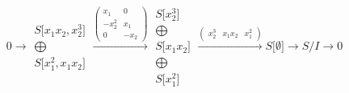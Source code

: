 \documentclass[12pt,a3paper,landscape]{amsart}
\numberwithin{equation}{section}
\theoremstyle{plain}
\theoremstyle{definition}
\begin{document}
$$
0 \rightarrow \begin{matrix}
S \lbrack x_{1}x_{2},x_{2}^{3} \rbrack \\ \bigoplus \\
S \lbrack x_{1}^{2},x_{1}x_{2} \rbrack
\end{matrix}
\xrightarrow{\left( \begin{matrix}
x_{1} & 0 \\
-x_{2}^{2} & x_{1} \\
0 & -x_{2}
\end{matrix} \right)}\begin{matrix}
S \lbrack x_{2}^{3} \rbrack \\ \bigoplus \\
S \lbrack x_{1}x_{2} \rbrack \\ \bigoplus \\
S \lbrack x_{1}^{2} \rbrack
\end{matrix}
\xrightarrow{\left( \begin{matrix}
x_{2}^{3} & x_{1}x_{2} & x_{1}^{2}
\end{matrix} \right)}S \lbrack \emptyset \rbrack \rightarrow S/I \rightarrow 0
$$
\end{document}

